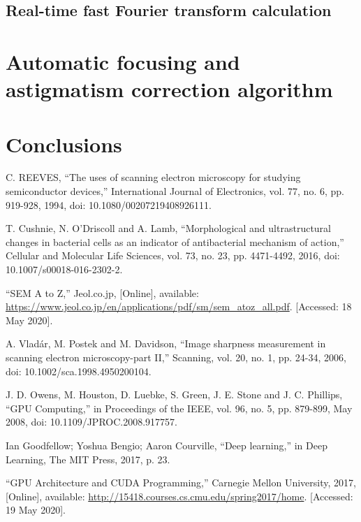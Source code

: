 \documentclass[12pt, twocolumn]{report}
\begin{document}
\section{Real-time fast Fourier transform calculation}

\chapter{Automatic focusing and astigmatism correction algorithm}

\chapter{Conclusions}

\begin{thebibliography}{00}
    C. REEVES, ``The uses of scanning electron microscopy for studying semiconductor devices,'' International Journal of Electronics, vol. 77, no. 6, pp. 919-928, 1994, doi: 10.1080/00207219408926111.

    T. Cushnie, N. O’Driscoll and A. Lamb, ``Morphological and ultrastructural changes in bacterial cells as an indicator of antibacterial mechanism of action,'' Cellular and Molecular Life Sciences, vol. 73, no. 23, pp. 4471-4492, 2016, doi: 10.1007/s00018-016-2302-2.

    ``SEM A to Z,'' Jeol.co.jp, [Online], available: \url{https://www.jeol.co.jp/en/applications/pdf/sm/sem_atoz_all.pdf}. [Accessed: 18 May 2020].

    A. Vladár, M. Postek and M. Davidson, ``Image sharpness measurement in scanning electron microscopy-part II,'' Scanning, vol. 20, no. 1, pp. 24-34, 2006, doi: 10.1002/sca.1998.4950200104.

    J. D. Owens, M. Houston, D. Luebke, S. Green, J. E. Stone and J. C. Phillips, ``GPU Computing,'' in Proceedings of the IEEE, vol. 96, no. 5, pp. 879-899, May 2008, doi: 10.1109/JPROC.2008.917757.

    Ian Goodfellow; Yoshua Bengio; Aaron Courville, ``Deep learning,'' in Deep Learning, The MIT Press, 2017, p. 23.

    ``GPU Architecture and CUDA Programming,'' Carnegie Mellon University, 2017, [Online], available: \url{http://15418.courses.cs.cmu.edu/spring2017/home}. [Accessed: 19 May 2020].
\end{thebibliography}
\end{document}

